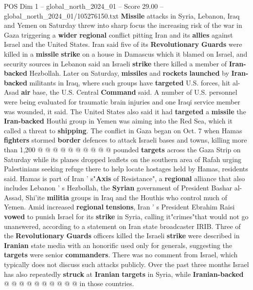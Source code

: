 \begin{textsample}{POS Dim 1 – global\_north\_2024\_01 – Score 29.00 – global\_north\_2024\_01/105276150.txt}  \label{ex:f1_pos_123}
\textbf{Missile} attacks in Syria, Lebanon, Iraq and Yemen on Saturday threw into sharp focus the increasing risk of the war in Gaza triggering a \textbf{wider} \textbf{regional} conflict pitting Iran and its \textbf{allies} against Israel and the United States.
Iran said five of its \textbf{Revolutionary} \textbf{Guards} were killed in a \textbf{missile} \textbf{strike} on a house in Damascus which it blamed on Israel, and security sources in Lebanon said an Israeli \textbf{strike} there killed a member of \textbf{Iran-backed} Hezbollah.
Later on Saturday, \textbf{missiles} and \textbf{rockets} \textbf{launched} by \textbf{Iran-backed} militants in Iraq, where such groups have \textbf{targeted} U.S. forces, hit al-Asad \textbf{air} base, the U.S.
Central \textbf{Command} said.
A number of U.S. personnel were being evaluated for traumatic brain injuries and one Iraqi service member was wounded, it said.
The United States also said it had \textbf{targeted} a \textbf{missile} the \textbf{Iran-backed} Houthi group in Yemen was aiming into the Red Sea, which it called a threat to \textbf{shipping}.
The conflict in Gaza began on Oct. 7 when Hamas \textbf{fighters} stormed \textbf{border} defences to attack Israeli bases and towns, killing more than 1,200 @ @ @ @ @ @ @ @ @ @ pounded \textbf{targets} across the Gaza Strip on Saturday while its planes dropped leaflets on the southern area of Rafah urging Palestinians seeking refuge there to help locate hostages held by Hamas, residents said.
Hamas is part of Iran ' s"\textbf{Axis} of Resistance", a \textbf{regional} alliance that also includes Lebanon ' s Hezbollah, the \textbf{Syrian} government of President Bashar al-Assad, Shi'ite \textbf{militia} groups in Iraq and the Houthis who control much of Yemen.
Amid increased \textbf{regional} \textbf{tensions}, Iran ' s President Ebrahim Raisi \textbf{vowed} to punish Israel for its \textbf{strike} in Syria, calling it"crimes"that would not go unanswered, according to a statement on Iran state broadcaster IRIB.
Three of the \textbf{Revolutionary} \textbf{Guards} officers killed the Israeli \textbf{strike} were described in \textbf{Iranian} state media with an honorific used only for generals, suggesting the \textbf{targets} were senior \textbf{commanders}.
There was no comment from Israel, which typically does not discuss such attacks publicly.
Over the past three months Israel has also repeatedly \textbf{struck} at \textbf{Iranian} \textbf{targets} in Syria, while \textbf{Iranian-backed} @ @ @ @ @ @ @ @ @ @ in those countries.

\end{textsample}

